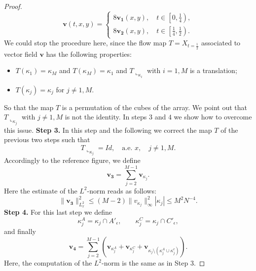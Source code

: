 \documentclass[12 pt]{article}
\theoremstyle{definition} \newtheorem{definition}{Definition}[section]
\theoremstyle{definition} \newtheorem{remark}[definition]{Remark}
\theoremstyle{plain} \newtheorem{lemma}[definition]{Lemma}
\theoremstyle{plain} \newtheorem{proposition}[definition]{Proposition}
\theoremstyle{plain} \newtheorem{theorem}[definition]{Theorem}
\theoremstyle{plain} \newtheorem{corollary}[definition]{Corollary}
\theoremstyle{definition} \newtheorem{example}[definition]{Example}
\theoremstyle{definition} \newtheorem{assumption}[definition]{Assumption}
\theoremstyle{definition} \newtheorem{conjecture}[definition]{Conjecture}
\newcommand{\1}{\mathbbm 1}
\numberwithin{equation}{section}
\begin{document}
\begin{appendix}
\begin{proof}
 \begin{equation*}
     \mathbf v(t,x,y)=\begin{cases}
         8 \mathbf{v_1}(x,y),\quad t\in\left[0,\frac{1}{4}\right), \\
         8 \mathbf{v_2}(x,y), \quad t\in\left[\frac{1}{4},\frac{1}{2}\right).
     \end{cases}
 \end{equation*}
 We could stop the procedure here, since the flow map $T=X_{t=\frac{1}{2}}$ associated to vector field $\mathbf v$ has the following properties:
 \begin{itemize}
     \item $T(\kappa_1)=\kappa_M$ and $T(\kappa_M)=\kappa_1$ and $T\llcorner_{ \kappa_i}$ with $i=1,M$ is a translation;
     \item $T(\kappa_j)=\kappa_j$ for $j\not=1,M$.
 \end{itemize}
So that the map $T$ is a permutation of the cubes of the array. We point out that $T\llcorner_{\kappa_j}$ with $j\not=1,M$ is not the identity. In steps $3$ and $4$ we show how to overcome this issue. 
     \textbf{Step 3.} In this step and the following we correct the map $T$ of the previous two steps such that
     \begin{equation*}
         T\llcorner_{\kappa_j}=Id,\quad \text{a.e. }x,  \quad j\not=1,M. 
     \end{equation*}
     Accordingly to the reference figure, we define
     \begin{equation*}
         \mathbf{v_3}=\sum_{j=2}^{M-1}  \mathbf v_{\kappa_j}.
     \end{equation*}
     Here the estimate of the $L^2$-norm reads as follows:
     \begin{equation*}
         \|\mathbf{v_3}\|^2_{L^2_x}\leq (M-2)\|v_{\kappa_j}\|^2_\infty |\kappa_j|\leq M^2N^{-4}.
     \end{equation*}
     \textbf{Step 4.}
     For this last step we define
     \begin{equation*}
         \kappa_j^A=\kappa_j\cap A'_{\epsilon},\qquad \kappa_j^C=\kappa_j\cap C'_\epsilon,
     \end{equation*}
     and finally
     \begin{equation*}
         \mathbf{v_4}=\sum_{j=2}^{M-1}\left(\mathbf{v}_{\kappa_j^A}+\mathbf{v}_{\kappa_j^C}+\mathbf{v}_{\kappa_j\setminus(\kappa_j^A\cup\kappa_j^c)}\right).
     \end{equation*}
     Here, the computation of the $L^2$-norm is the same as in Step 3. 


\end{proof}
\end{appendix}
\end{document}
